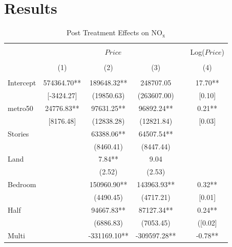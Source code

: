 \documentclass[12pt]{report}
\begin{document}
\section*{Results}
\begin{table}[h!]
\centering
\begin{threeparttable}

\caption{Post Treatment Effects on $\text{NO}_\text{x}$}
\begin{tabular}{lccccc} 
\hline\hline\\[0.001ex]
         &           \multicolumn{4}{c}{$Price$} &                        \multicolumn{1}{c}{Log($Price$)}                 \\ [0.1ex] \cline{2-4} \cline{6-6}  
\\[0.001ex]
         &                   (1) &              (2) &                      (3) &&                            (4) \\ [0.5ex] 
\hline \\[0.1ex]
Intercept&	574364.70\footnotesize***&	189648.32\footnotesize***&	248707.05&&	17.70\footnotesize*** \\
&	\footnotesize[-3424.27]&	\footnotesize(19850.63)&	\footnotesize(263607.00)&&	\footnotesize[0.10] \\
metro50&	24776.83\footnotesize***&	97631.25\footnotesize***&	96892.24\footnotesize***&&	0.21\footnotesize*** \\
&	\footnotesize[8176.48]&	\footnotesize(12838.28)&	\footnotesize(12821.84)&&	\footnotesize[0.03] \\
Stories&	&	63388.06\footnotesize***&	64507.54\footnotesize***&	 \\
&	&	\footnotesize(8460.41)&	\footnotesize(8447.44)	&& \\
Land&	 &	7.84\footnotesize***&	9.04&	& \\
&	&	\footnotesize(2.52)&	\footnotesize(2.53)&	& \\
Bedroom&	&	150960.90\footnotesize***&	143963.93\footnotesize***&&	0.32\footnotesize*** \\
&	&	\footnotesize(4490.45)&	\footnotesize(4717.21)&&	\footnotesize[0.01]\\
Half&	&	94667.83\footnotesize***&	87127.34\footnotesize***&&	0.24\footnotesize*** \\
&	&	\footnotesize(6886.83)&	\footnotesize(7053.45)&&	\footnotesize([0.02]\\
Multi&	&	-331169.10\footnotesize***&	-309597.28\footnotesize***&&	-0.78\footnotesize*** \\

\end{tabular}
\end{threeparttable}
\end{table}
\end{document}
